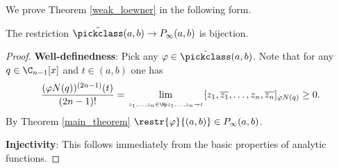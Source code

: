 We prove Theorem \ref{weak_loewner} in the following form.
\begin{lause}\label{better_weak_loewner}
	The restriction $\tilde{\pickclass}(a, b) \to P_{\infty}(a, b)$ is bijection.
\end{lause}
\begin{proof}
	\textbf{Well-definedness}: Pick any $\varphi \in \tilde{\pickclass}(a, b)$. Note that for any $q \in \C_{n - 1}[x]$ and $t \in (a, b)$ one has
	\begin{align*}
		\frac{(\varphi N(q))^{(2 n - 1)}(t)}{(2 n - 1)!} = \lim_{\atop{z_{1}, \ldots, z_{n} \in \Hp}{z_{1}, \ldots, z_{n} \to t}} [z_{1}, \overline{z_{1}}, \ldots, z_{n}, \overline{z_{n}}]_{\varphi N(q)} \geq 0.
	\end{align*}
	By Theorem \ref{main_theorem} $\restr{\varphi}{(a, b)} \in P_{\infty}(a, b)$.

	\textbf{Injectivity}: This follows immediately from the basic properties of analytic functions.


\end{proof}
